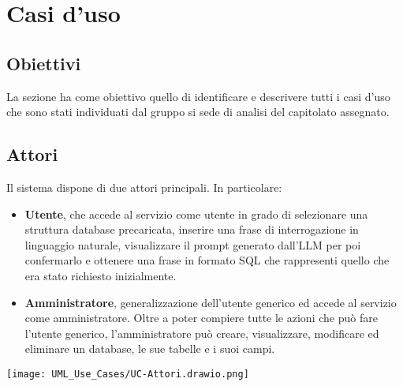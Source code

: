 \section{Casi d'uso}



\subsection{Obiettivi}
La sezione ha come obiettivo quello di identificare e descrivere tutti i casi d'uso che sono stati individuati dal gruppo si sede di analisi del capitolato assegnato.

\subsection{Attori}
Il sistema dispone di due attori principali. In particolare:
\begin{itemize}
	\item \textbf{Utente}, che accede al servizio come utente in grado di selezionare una struttura database precaricata, inserire una frase di interrogazione in linguaggio naturale, visualizzare il prompt generato dall'LLM per poi confermarlo e ottenere una frase in formato SQL che rappresenti quello che era stato richiesto inizialmente.
	\item \textbf{Amministratore}, generalizzazione dell'utente generico ed accede al servizio come amministratore. Oltre a poter compiere tutte le azioni che può fare l'utente generico, l'amministratore può creare, visualizzare, modificare ed eliminare un database, le sue tabelle e i suoi campi.
\end{itemize}
\texttt{[image: UML\_Use\_Cases/UC-Attori.drawio.png]}

